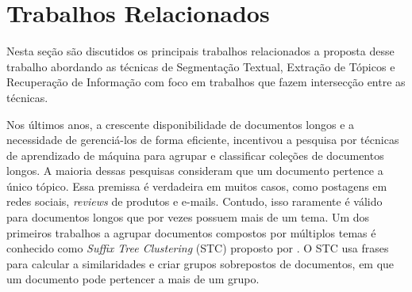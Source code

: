 \section{Trabalhos Relacionados}




Nesta seção são discutidos os principais trabalhos relacionados a proposta desse trabalho abordando as técnicas de Segmentação Textual, Extração de Tópicos e Recuperação de Informação com foco em trabalhos que fazem intersecção entre as técnicas.

Nos últimos anos, a crescente disponibilidade de documentos longos e a necessidade de gerenciá-los de forma eficiente, incentivou a pesquisa por técnicas de aprendizado de máquina para agrupar e classificar coleções de documentos longos. A maioria dessas pesquisas consideram que um documento pertence a único tópico. Essa premissa é verdadeira em muitos casos, como postagens em redes sociais, \textit{reviews} de produtos e e-mails. 
Contudo, isso raramente é válido para documentos longos que por vezes possuem mais de um tema. 
Um dos primeiros trabalhos a agrupar documentos compostos por múltiplos temas é conhecido como \textit{Suffix Tree Clustering} (STC) proposto por \cite{Zamir1998}. O STC usa frases para calcular a similaridades e criar grupos sobrepostos de documentos, em que um documento pode pertencer a mais de um grupo.

